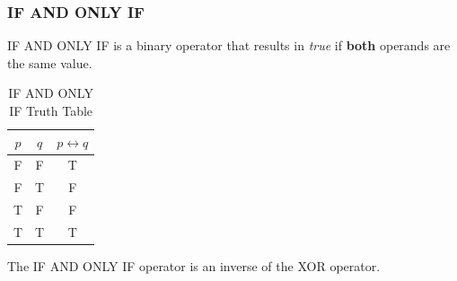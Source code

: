 \documentclass{article}
\begin{document}
\subsubsection{IF AND ONLY IF}
IF AND ONLY IF is a binary operator that results in \emph{true} if \textbf{both} operands are the same value.
\begin{table}[h]
    \centering
    \caption{IF AND ONLY IF Truth Table}
    \begin{tabular}{c|c|c}
        \(p\) & \(q\) & \(p \leftrightarrow q\) \\ \hline
        F     & F     & T              \\
        F     & T     & F              \\
        T     & F     & F              \\
        T     & T     & T              \\
    \end{tabular}
\end{table}
\begin{tcolorbox}[title=Note]
    The IF AND ONLY IF operator is an inverse of the XOR operator.
\end{tcolorbox}
\end{document}
